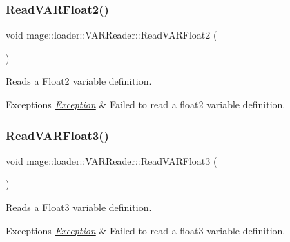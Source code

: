 \subsubsection{\texorpdfstring{Read\+V\+A\+R\+Float2()}{ReadVARFloat2()}}
{\footnotesize\ttfamily void mage\+::loader\+::\+V\+A\+R\+Reader\+::\+Read\+V\+A\+R\+Float2 (\begin{DoxyParamCaption}{ }\end{DoxyParamCaption})\hspace{0.3cm}{\ttfamily [private]}}

Reads a Float2 variable definition.


\begin{DoxyExceptions}{Exceptions}
{\em \mbox{\hyperlink{classmage_1_1_exception}{Exception}}} & Failed to read a float2 variable definition. \\
\hline
\end{DoxyExceptions}
\mbox{\label{classmage_1_1loader_1_1_v_a_r_reader_a133ffd4462be737377c0cdb921a90e75}} 
\subsubsection{\texorpdfstring{Read\+V\+A\+R\+Float3()}{ReadVARFloat3()}}
{\footnotesize\ttfamily void mage\+::loader\+::\+V\+A\+R\+Reader\+::\+Read\+V\+A\+R\+Float3 (\begin{DoxyParamCaption}{ }\end{DoxyParamCaption})\hspace{0.3cm}{\ttfamily [private]}}

Reads a Float3 variable definition.


\begin{DoxyExceptions}{Exceptions}
{\em \mbox{\hyperlink{classmage_1_1_exception}{Exception}}} & Failed to read a float3 variable definition. \\
\hline
\end{DoxyExceptions}
\mbox{\label{classmage_1_1loader_1_1_v_a_r_reader_a70dfe7e7e0b2fb9a79b6ff4342cc58dc}} 
